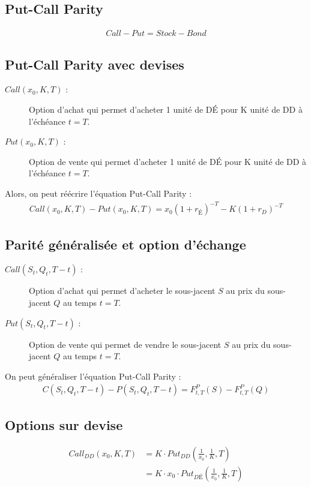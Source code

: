 \documentclass[10pt, french]{article}
\begin{document}
\begin{multicols*}{2}
\setcounter{section}{8}
\section{Put-Call Parity}
\begin{align*}
Call - Put = Stock - Bond
\end{align*}

\subsection*{Put-Call Parity avec devises}
\begin{description}
\item[$Call(x_0, K, T)$ : ] Option d'achat qui permet d'acheter 1 unité de DÉ pour K unité de DD à l'échéance $t = T$.
\item[$Put(x_0, K, T)$ : ] Option de vente qui permet d'acheter 1 unité de DÉ pour K unité de DD à l'échéance $t = T$.
\end{description}
Alors, on peut réécrire l'équation Put-Call Parity : 
\begin{align*}
Call(x_0, K,T) - Put(x_0, K, T) = x_0(1+r_{É})^{-T} - K(1+r_D)^{-T}
\end{align*}


\subsection*{Parité généralisée et option d'échange}
\begin{description}
\item[$Call(S_t, Q_t, T - t)$ : ] Option d'achat qui permet d'acheter le sous-jacent $S$ au prix du sous-jacent $Q$ au temps $t = T$.
\item[$Put(S_t, Q_t, T - t)$ : ] Option de vente qui permet de vendre le sous-jacent $S$ au prix du sous-jacent $Q$ au temps $t = T$.
\end{description}
On peut généraliser l'équation Put-Call Parity : 
\begin{align*}
C(S_t, Q_t, T - t) - P(S_t, Q_t, T-t) = F_{t,T}^{P}(S) - F_{t,T}^{P}(Q)
\end{align*}

\subsection*{Options sur devise}
\begin{align*}
Call_{DD}(x_0, K, T) & = K \cdot Put_{DD}\left( \frac{1}{x_0}, \frac{1}{K}, T \right) \\
& = K \cdot x_0 \cdot Put_{DÉ} \left( \frac{1}{x_0}, \frac{1}{K}, T \right) \\
\end{align*}



\end{multicols*}
\end{document}
